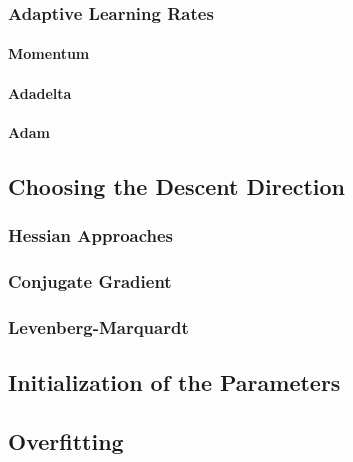 			\subsubsection{Adaptive Learning Rates} %

				\paragraph{Momentum} %

				\paragraph{Adadelta} %

				\paragraph{Adam} %

		\subsection{Choosing the Descent Direction} %

			\subsubsection{Hessian Approaches} %

			\subsubsection{Conjugate Gradient} %

			\subsubsection{Levenberg-Marquardt} %

		\subsection{Initialization of the Parameters} %

		\subsection{Overfitting} %

